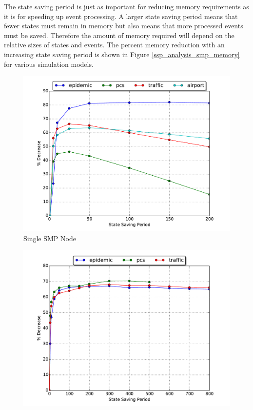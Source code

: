 \documentclass[11pt]{book}
\begin{document}
The state saving period is just as important for reducing memory requirements as it is for
speeding up event processing.  A larger state saving period means that fewer states must remain
in memory but also means that more processed events must be saved.  Therefore the amount of
memory required will depend on the relative sizes of states and events.  The percent memory
reduction with an increasing state saving period is shown in Figure \ref{ssp_analysis_smp_memory}
for various simulation models.

\begin{figure}
  \begin{minipage}{.5\textwidth}
    \begin{center}
      \includegraphics[width=\textwidth,keepaspectratio,quiet]{figs/state_saving/bc/percent_memory_decrease.pdf} \\
      Single SMP Node \\
    \end{center}
  \end{minipage}%
  \hfill
  \begin{minipage}{.5\textwidth}
    \begin{center}
      \includegraphics[width=\textwidth,keepaspectratio,quiet]{figs/state_saving/beowulf/percent_memory_decrease.pdf} \\

\end{center}
\end{minipage}
\end{figure}
\end{document}
